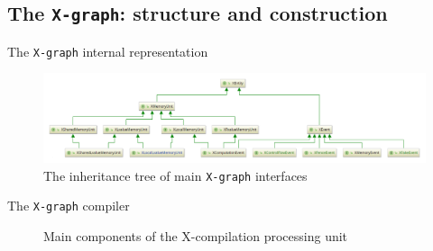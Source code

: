 \documentclass{beamer}
\begin{document}
\subsection{The \texttt{X-graph}: structure and construction}

\begin{frame}{The \texttt{X-graph} internal representation}
  \centering
  \begin{figure}
    \includegraphics[width=1.1\textwidth,keepaspectratio]{../img/my/class-diagrams/XEntity-interfaces.png}
    \caption{The inheritance tree of main \texttt{X-graph} interfaces}
  \end{figure}
  
\end{frame}


\begin{frame}{The \texttt{X-graph} compiler}
\begin{figure}
  \centering
  \caption{Main components of the X-compilation processing unit}
\end{figure}
\end{frame}
\end{document}
